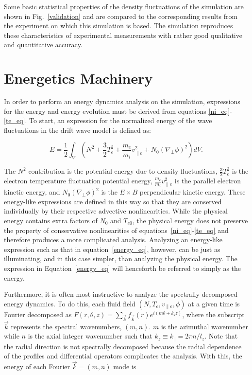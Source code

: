 \documentclass[showpacs,preprintnumbers,amsmath,amssymb,superscriptaddress,aip]{revtex4-1}
\def\beq{\begin{equation}}
\def\eeq{\end{equation}}
\def\para{\parallel}
\def\grad{\nabla}
\newcommand{\gradperp}{\grad_\perp}
\newcommand{\vpe}{v_{\parallel e}}
\begin{document}
Some basic statistical properties of the density fluctuations of the
simulation are shown in Fig.~\ref{validation} and are  compared to the corresponding results from the experiment on which
this simulation is based. The simulation reproduces these characteristics of experimental measurements with rather good qualitative and quantitative accuracy.

\section{Energetics Machinery}
\label{sec_energetics_machinery}

In order to perform an energy dynamics analysis on the simulation, expressions for the energy and energy evolution must be derived from equations \ref{ni_eq}-\ref{te_eq}.
To start, an expression for the normalized energy of the wave fluctuations in the drift wave model is defined as:

\beq
\label{energy_eq}
E = \frac{1}{2} \int_V  (N^2 + \frac{3}{2} T_e^2 + \frac{m_e}{m_i} \vpe^2 + N_0 (\gradperp \phi)^2 ) dV.
\eeq

The $N^2$ contribution is the potential energy due to density fluctuations, $\frac{3}{2} T_e^2$ is the electron temperature fluctuation potential energy,
$\frac{m_e}{m_i} \vpe^2$ is the parallel electron kinetic energy, and $N_0 (\gradperp \phi)^2$ is the $E \times B$ perpendicular kinetic energy.
These energy-like expressions are defined in this way so that they are conserved individually by their respective advective nonlinearities. While the physical energy contains
extra factors of $N_0$ and $T_{e0}$, the physical energy does not preserve the property of conservative nonlinearities of equations~\ref{ni_eq}-\ref{te_eq} and therefore produces
a more complicated analysis. Analyzing an energy-like expression such as that in equation~\ref{energy_eq}, however, can be just as illuminating, and in this case simpler,
than analyzing the physical energy.
The expression in Equation~\ref{energy_eq} will henceforth be referred to simply as the energy.

Furthermore, it is often most instructive to analyze the spectrally decomposed energy dynamics. 
To do this, each fluid field $(N,T_e,\vpe,\phi)$ at a given time is Fourier decomposed as 
$F(r,\theta,z) = \sum_{\vec{k}} f_{\vec{k}}(r) e^{i (m \theta + k_z z )}$,
where the subscript $\vec{k}$ represents the spectral wavenumbers, $(m,n)$. 
$m$ is the azimuthal wavenumber while $n$ is the axial integer wavenumber such that $k_z \equiv k_\para = 2 \pi n/l_z$. 
Note that the radial direction is not spectrally decomposed because the radial dependence of the profiles and differential operators complicates the analysis.
With this, the energy of each Fourier $\vec{k} = (m,n)$ mode is
\end{document}
